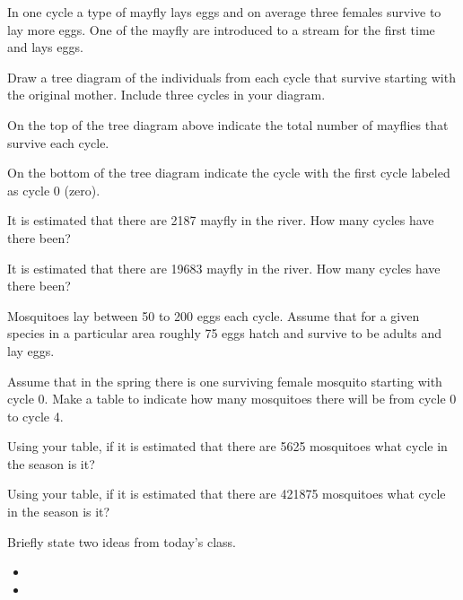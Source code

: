 \begin{problem}
\clearpage

\item In one cycle a type of mayfly lays eggs and on average three
  females survive to lay more eggs. One of the mayfly are introduced
  to a stream for the first time and lays eggs. 
  \begin{subproblem}
  \item Draw a tree diagram of the individuals from each cycle that
    survive starting with the original mother. Include three cycles in
    your diagram.
    \vfill
  \item On the top of the tree diagram above indicate the total number
    of mayflies that survive each cycle.
  \item On the bottom of the tree diagram indicate the cycle with the
    first cycle labeled as cycle 0 (zero).
  \item It is estimated that there are 2187 mayfly in the river. How
    many cycles have there been?
    \vspace{3em}
  \item It is estimated that there are 19683 mayfly in the river. How
    many cycles have there been?
    \vspace{3em}
  \end{subproblem}

\clearpage

\item Mosquitoes lay between 50 to 200 eggs each cycle. Assume that
  for a given species in a particular area roughly 75 eggs hatch and
  survive to be adults and lay eggs.
  \begin{subproblem}
  \item Assume that in the spring there is one surviving female
    mosquito starting with cycle 0. Make a table to indicate how many
    mosquitoes there will be from cycle 0 to cycle 4.
    \vfill
  \item Using your table, if it is estimated that there are 5625
    mosquitoes what cycle in the season is it?
    \vfill
  \item Using your table, if it is estimated that there are 421875
    mosquitoes what cycle in the season is it?
    \vfill
  \end{subproblem}

\end{problem}

\postClass

\begin{problem}
\item Briefly state two ideas from today's class.
  \begin{itemize}
  \item 
  \item 
  \end{itemize}
\item 
  \begin{subproblem}
    \item
  \end{subproblem}
\end{problem}




